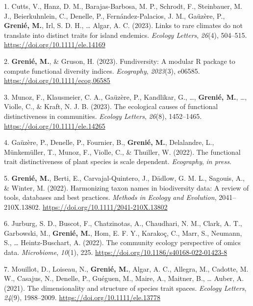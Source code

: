 \documentclass[12pt,a4paper,]{article}
\newlength{\cslhangindent}
\newenvironment{CSLReferences}[2] %
 {\begin{list}{}{%
  \setlength{\itemindent}{0pt}
  \setlength{\leftmargin}{0pt}
  \setlength{\parsep}{0pt}
  \ifodd #1
   \setlength{\leftmargin}{\cslhangindent}
   \setlength{\itemindent}{-1\cslhangindent}
  \fi
  \setlength{\itemsep}{#2\baselineskip}}}
 {\end{list}}
\begin{document}
\label{refs-86c4a80be2a3d18425d3a7c99120529a}
\begin{CSLReferences}{1}{0.5}
1. Cutts, V., Hanz, D. M., Barajas-Barbosa, M. P., Schrodt, F.,
Steinbauer, M. J., Beierkuhnlein, C., Denelle, P., Fernández-Palacios,
J. M., Gaüzère, P., \textbf{Grenié, M.}, Irl, S. D. H., \ldots{} Algar,
A. C. (2023). Links to rare climates do not translate into distinct
traits for island endemics. \emph{Ecology Letters}, \emph{26}(4),
504--515. \url{https://doi.org/10.1111/ele.14169}

2. \textbf{Grenié, M.}, \& Gruson, H. (2023). Fundiversity: A modular R
package to compute functional diversity indices. \emph{Ecography},
\emph{2023}(3), e06585. \url{https://doi.org/10.1111/ecog.06585}

3. Munoz, F., Klausmeier, C. A., Gaüzère, P., Kandlikar, G., \ldots,
\textbf{Grenié, M.}, \ldots, Violle, C., \& Kraft, N. J. B. (2023). The
ecological causes of functional distinctiveness in communities.
\emph{Ecology Letters}, \emph{26}(8), 1452--1465.
\url{https://doi.org/10.1111/ele.14265}

4. Gaüzère, P., Denelle, P., Fournier, B., \textbf{Grenié, M.},
Delalandre, L., Münkemüller, T., Munoz, F., Violle, C., \& Thuiller, W.
(2022). The functional trait distinctiveness of plant species is scale
dependent. \emph{Ecography}, \emph{in press}.

5. \textbf{Grenié, M.}, Berti, E., Carvajal-Quintero, J., Dädlow, G. M.
L., Sagouis, A., \& Winter, M. (2022). Harmonizing taxon names in
biodiversity data: A review of tools, databases and best practices.
\emph{Methods in Ecology and Evolution}, 2041--210X.13802.
\url{https://doi.org/10.1111/2041-210X.13802}

6. Jurburg, S. D., Buscot, F., Chatzinotas, A., Chaudhari, N. M., Clark,
A. T., Garbowski, M., \textbf{Grenié, M.}, Hom, E. F. Y., Karakoç, C.,
Marr, S., Neumann, S., \ldots{} Heintz-Buschart, A. (2022). The
community ecology perspective of omics data. \emph{Microbiome},
\emph{10}(1), 225. \url{https://doi.org/10.1186/s40168-022-01423-8}

7. Mouillot, D., Loiseau, N., \textbf{Grenié, M.}, Algar, A. C.,
Allegra, M., Cadotte, M. W., Casajus, N., Denelle, P., Guéguen, M.,
Maire, A., Maitner, B., \ldots{} Auber, A. (2021). The dimensionality
and structure of species trait spaces. \emph{Ecology Letters},
\emph{24}(9), 1988--2009. \url{https://doi.org/10.1111/ele.13778}


\end{CSLReferences}
\end{document}
